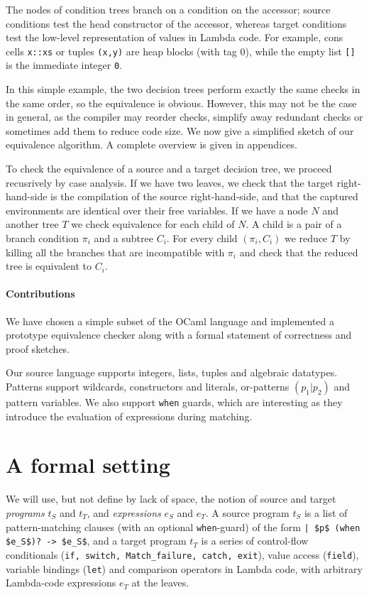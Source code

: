 \documentclass[12pt]{article}
\begin{document}
The nodes of condition trees branch on a condition on the accessor;
source conditions test the head constructor of the accessor, whereas
target conditions test the low-level representation of values in
Lambda code. For example, cons cells \texttt{x::xs} or tuples
\texttt{(x,y)} are heap blocks (with tag 0), while the empty list
\texttt{[]} is the immediate integer \texttt{0}.

In this simple example, the two decision trees perform exactly the
same checks in the same order, so the equivalence is obvious. However,
this may not be the case in general, as the compiler may reorder
checks, simplify away redundant checks or sometimes add them to reduce
code size.
%
We now give a simplified sketch of our equivalence
algorithm. A complete overview is given in appendices.

To check the equivalence of a source and a target decision tree,
we proceed recusrively by case analysis.
%
If we have two leaves, we check that the target right-hand-side is the
compilation of the source right-hand-side, and that the captured
environments are identical over their free variables.
%
If we have a node $N$ and another tree $T$ we check equivalence for
each child of $N$. A child is a pair of a branch condition $\pi_i$ and a
subtree $C_i$. For every child $(\pi_i, C_i)$ we reduce $T$ by killing all
the branches that are incompatible with $\pi_i$ and check that the
reduced tree is equivalent to $C_i$.

\paragraph{Contributions} We have chosen a simple subset of the OCaml
language and implemented a prototype equivalence checker along with
a formal statement of correctness and proof sketches.

Our source language supports integers, lists, tuples and algebraic
datatypes. Patterns support wildcards, constructors and literals,
or-patterns $(p_1 | p_2)$ and pattern variables.  We also support
\texttt{when} guards, which are interesting as they introduce the
evaluation of expressions during matching.

\newpage
\appendix

\section{A formal setting}

We will use, but not define by lack of space, the notion of source and
target \emph{programs} $t_S$ and $t_T$, and \emph{expressions} $e_S$
and $e_T$. A source program $t_S$ is a list of pattern-matching
clauses (with an optional \texttt{when}-guard) of the form
\lstinline{| $p$ (when $e_S$)? -> $e_S$}, and a target program $t_T$
is a series of control-flow conditionals (\texttt{if, switch,
  Match\_failure, catch, exit}), value access (\texttt{field}),
variable bindings (\texttt{let}) and comparison operators in Lambda
code, with arbitrary Lambda-code expressions $e_T$ at the leaves.
\end{document}
